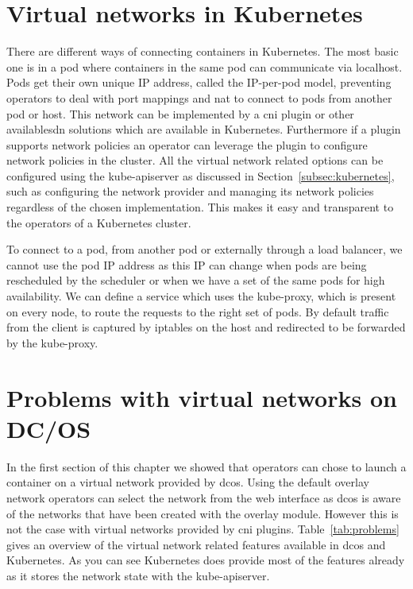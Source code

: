 \section{Virtual networks in Kubernetes}
\label{sec:k8s-virtual-networks}
There are different ways of connecting containers in Kubernetes. The most basic one is in a pod where containers in the same pod can communicate via localhost. Pods get their own unique IP address, called the IP-per-pod model, preventing operators to deal with port mappings and \gls{nat} to connect to pods from another pod or host. This network can be implemented by a \gls{cni} plugin or other available\gls{sdn} solutions\cite{k8s-network} which are available in Kubernetes. Furthermore if a plugin supports network policies an operator can leverage the plugin to configure network policies in the cluster. All the virtual network related options can be configured using the kube-apiserver as discussed in Section~\ref{subsec:kubernetes}, such as configuring the network provider and managing its network policies regardless of the chosen implementation. This makes it easy and transparent to the operators of a Kubernetes cluster.

To connect to a pod, from another pod or externally through a load balancer, we cannot use the pod IP address as this IP can change when pods are being rescheduled by the scheduler or when we have a set of the same pods for high availability. We can define a service which uses the kube-proxy, which is present on every node, to route the requests to the right set of pods. By default traffic from the client is captured by iptables\cite{iptables} on the host and redirected to be forwarded by the kube-proxy.

\section{Problems with virtual networks on DC/OS}
\label{sec:problems}
In the first section of this chapter we showed that operators can chose to launch a container on a virtual network provided by \gls{dcos}. Using the default overlay network operators can select the network from the web interface as \gls{dcos} is aware of the networks that have been created with the overlay module. However this is not the case with virtual networks provided by \gls{cni} plugins. Table~\ref{tab:problems} gives an overview of the virtual network related features available in \gls{dcos} and Kubernetes. As you can see Kubernetes does provide most of the features already as it stores the network state with the kube-apiserver.

